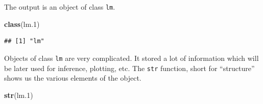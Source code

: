 \documentclass[]{book}
\newenvironment{Shaded}{\begin{snugshade}}{\end{snugshade}}
\newcommand{\KeywordTok}[1]{\textcolor[rgb]{0.13,0.29,0.53}{\textbf{{#1}}}}
\newcommand{\FloatTok}[1]{\textcolor[rgb]{0.00,0.00,0.81}{{#1}}}
\newcommand{\NormalTok}[1]{{#1}}
\theoremstyle{definition}
\theoremstyle{definition}
\theoremstyle{remark}
\begin{document}
The output is an object of class \texttt{lm}.

\begin{Shaded}
\begin{Highlighting}[]
\KeywordTok{class}\NormalTok{(lm}\FloatTok{.1}\NormalTok{)}
\end{Highlighting}
\end{Shaded}

\begin{verbatim}
## [1] "lm"
\end{verbatim}

Objects of class \texttt{lm} are very complicated. It stored a lot of
information which will be later used for inference, plotting, etc. The
\texttt{str} function, short for ``structure'' shows us the various
elements of the object.

\begin{Shaded}
\begin{Highlighting}[]
\KeywordTok{str}\NormalTok{(lm}\FloatTok{.1}\NormalTok{)}
\end{Highlighting}
\end{Shaded}
\end{document}

